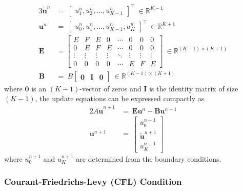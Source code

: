\documentclass{article}
\begin{document}
\begin{alignat}{3}
   \tilde{\mathbf{u}}^{n} &=\
   \begin{bmatrix}
      u_{1}^{n}, u_{2}^{n}, \ldots, u_{K-1}^{n}
   \end{bmatrix}^{\intercal}\ \in \mathbb{R}^{K-1} \nonumber \\
   \mathbf{u}^{n} &=\
   \begin{bmatrix}
      u_{0}^{n}, u_{1}^{n}, \ldots, u_{K-1}^{n}, u_{K}^{n}
   \end{bmatrix}^{\intercal}\ \in \mathbb{R}^{K+1} \nonumber \\
   \label{eqn: E matrix}
   \mathbf{E} &=
   \begin{bmatrix}
      E & F & E & 0 & \cdots & 0 & 0 & 0 \\
      0 & E & F & E & \cdots & 0 & 0 & 0 \\
      \vdots & \vdots & \vdots & \vdots & \ddots & \vdots & \vdots & \vdots \\
      0 & 0 & 0 & 0 & \cdots & E & F & E
   \end{bmatrix}\ \in \mathbb{R}^{\left(K-1\right) \times \left(K+1\right)} \\
   \label{eqn: B matrix}
   \mathbf{B} &=\
   B
   \begin{bmatrix}
      \mathbf{0} & \mathbf{I} & \mathbf{0}
   \end{bmatrix}\ \in \mathbb{R}^{\left(K-1\right) \times \left(K+1\right)}
\end{alignat}
where $\mathbf{0}$ is an $\left(K-1\right)$-vector of zeros and
$\mathbf{I}$ is the identity matrix of size $\left(K-1\right)$,
the update equations can be expressed compactly as
\begin{alignat}{2}
   \label{eqn: Difference eqn vectorized Pt. 1}
   A \tilde{\mathbf{u}}^{n+1} &=\ \mathbf{E} \mathbf{u}^{n} - \mathbf{B} \mathbf{u}^{n-1} \\
   \label{eqn: Difference eqn vectorized Pt. 2}
   \mathbf{u}^{n+1} &=\ 
   \begin{bmatrix}
      u_{0}^{n+1} \\
      \tilde{\mathbf{u}}^{n+1} \\
      u_{K}^{n+1}
   \end{bmatrix}
\end{alignat}
where $u_{0}^{n+1}$ and $u_{K}^{n+1}$ are determined from the boundary conditions.

\subsubsection{Courant-Friedrichs-Levy (CFL) Condition}
\label{subsubsec: Courant-Friedrichs-Levy (CFL) Condition}
\end{document}
